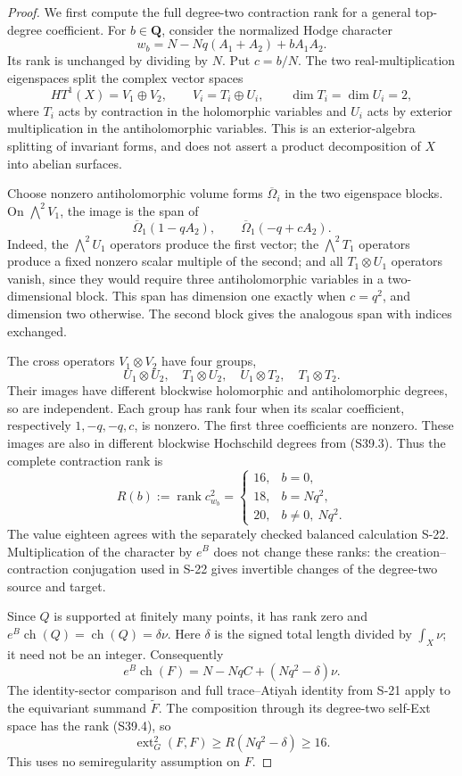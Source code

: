 \documentclass[11pt,a4paper]{article}
\theoremstyle{definition}
\begin{document}
\begin{proof}
We first compute the full degree-two contraction rank for a general
top-degree coefficient. For $b\in\mathbf Q$, consider the normalized
Hodge character
\[
 w_b=N-Nq(A_1+A_2)+bA_1A_2.
\]
Its rank is unchanged by dividing by $N$. Put $c=b/N$. The two
real-multiplication eigenspaces split the complex vector spaces
\[
 HT^1(X)=V_1\oplus V_2,
 \qquad V_i=T_i\oplus U_i,
 \qquad \dim T_i=\dim U_i=2,
\]
where $T_i$ acts by contraction in the holomorphic variables and $U_i$
acts by exterior multiplication in the antiholomorphic variables. This is
an exterior-algebra splitting of invariant forms, and does not assert a
product decomposition of $X$ into abelian surfaces.

Choose nonzero antiholomorphic volume forms $\overline\Omega_i$ in the
two eigenspace blocks. On $\bigwedge^2V_1$, the image is the span of
\[
 \overline\Omega_1(1-qA_2),\qquad
 \overline\Omega_1(-q+cA_2).
 \tag{S39.3}
\]
Indeed, the $\bigwedge^2U_1$ operators produce the first vector;
the $\bigwedge^2T_1$ operators produce a fixed nonzero scalar multiple
of the second; and all $T_1\otimes U_1$ operators vanish, since they
would require three antiholomorphic variables in a two-dimensional block.
This span has dimension one exactly when $c=q^2$, and dimension two
otherwise. The second block gives the analogous span with indices exchanged.

The cross operators $V_1\otimes V_2$ have four groups,
\[
 U_1\otimes U_2,\quad T_1\otimes U_2,\quad
 U_1\otimes T_2,\quad T_1\otimes T_2.
\]
Their images have different blockwise holomorphic and antiholomorphic
degrees, so are independent. Each group has rank four when its scalar
coefficient, respectively $1,-q,-q,c$, is nonzero. The first three
coefficients are nonzero. These images are also in different blockwise
Hochschild degrees from (S39.3). Thus the complete contraction rank is
\[
 R(b):=\operatorname{rank}c^2_{w_b}
 =\begin{cases}
 16,&b=0,\\
 18,&b=Nq^2,\\
 20,&b\ne0,\ Nq^2.
 \end{cases}
 \tag{S39.4}
\]
The value eighteen agrees with the separately checked balanced calculation
S-22. Multiplication of the character by $e^B$ does not change these ranks:
the creation--contraction conjugation used in S-22 gives invertible changes
of the degree-two source and target.

Since $Q$ is supported at finitely many points, it has rank zero and
$e^B\operatorname{ch}(Q)=\operatorname{ch}(Q)=\delta\nu$.
Here $\delta$ is the signed total length divided by
$\int_X\nu$; it need not be an integer. Consequently
\[
 e^B\operatorname{ch}(F)
   =N-NqC+(Nq^2-\delta)\nu.
 \tag{S39.5}
\]
The identity-sector comparison and full trace--Atiyah identity from S-21
apply to the equivariant summand $\widetilde F$. The composition through
its degree-two self-Ext space has the rank (S39.4), so
\[
 \operatorname{ext}^2_G(F,F)\ge R(Nq^2-\delta)\ge16.
 \tag{S39.6}
\]
This uses no semiregularity assumption on $F$.


\end{proof}
\end{document}
